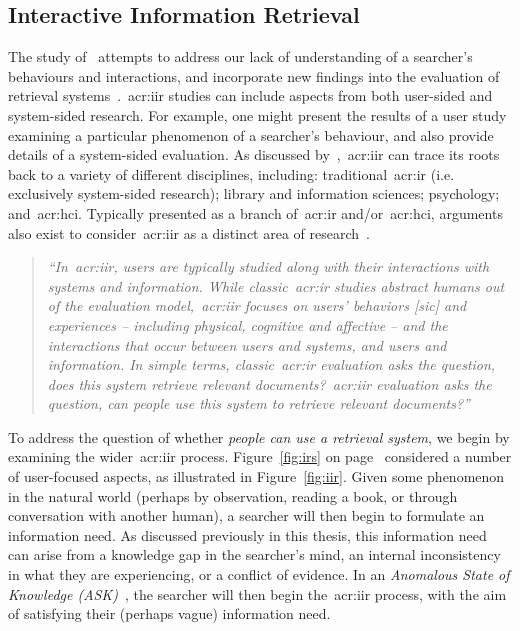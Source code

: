 \subsection{Interactive Information Retrieval}\label{sec:ir_background:user:iir}
The study of~ attempts to address our lack of understanding of a searcher's behaviours and interactions, and incorporate new findings into the evaluation of retrieval systems~\citep{callan2007minds}.~\gls{acr:iir} studies can include aspects from both user-sided and system-sided research. For example, one might present the results of a user study examining a particular phenomenon of a searcher's behaviour, and also provide details of a system-sided evaluation. As discussed by~\cite{kelly2009iir},~\gls{acr:iir} can trace its roots back to a variety of different disciplines, including: traditional~\gls{acr:ir} (i.e. exclusively system-sided research); library and information sciences; psychology; and~\gls{acr:hci}. Typically presented as a branch of~\gls{acr:ir} and/or~\gls{acr:hci}, arguments also exist to consider~\gls{acr:iir} as a distinct area of research~\citep{ruthven2008iir}.

\begin{quote}
\emph{``In~\gls{acr:iir}, users are typically studied along with their interactions with systems and information. While classic~\gls{acr:ir} studies abstract humans out of the evaluation model,~\gls{acr:iir} focuses on users' behaviors [sic] and experiences -- including physical, cognitive and affective -- and the interactions that occur between users and systems, and users and information. In simple terms, classic~\gls{acr:ir} evaluation asks the question, does this system retrieve relevant documents?~\gls{acr:iir} evaluation asks the question, can people use this system to retrieve relevant documents?''}
\end{quote}

To address the question of whether \emph{people can use a retrieval system}, we begin by examining the wider~\gls{acr:iir} process. Figure~\ref{fig:irs} on page~\pageref{fig:irs} considered a number of user-focused aspects, as illustrated in Figure~\ref{fig:iir}. Given some phenomenon in the natural world (perhaps by observation, reading a book, or through conversation with another human), a searcher will then begin to formulate an information need. As discussed previously in this thesis, this information need can arise from a knowledge gap in the searcher's mind, an internal inconsistency in what they are experiencing, or a conflict of evidence. In an \emph{Anomalous State of Knowledge (ASK)}~\citep{belkin1980ask}, the searcher will then begin the~\gls{acr:iir} process, with the aim of satisfying their (perhaps vague) information need.

